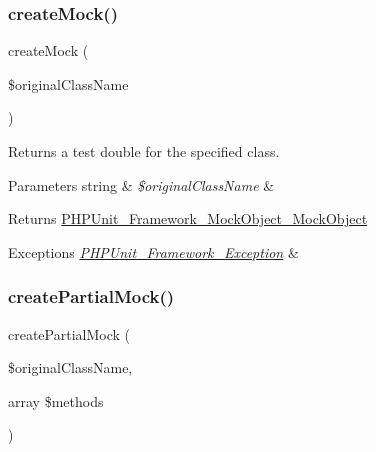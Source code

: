 \subsubsection{\texorpdfstring{create\+Mock()}{createMock()}}
{\footnotesize\ttfamily create\+Mock (\begin{DoxyParamCaption}\item[{}]{\$original\+Class\+Name }\end{DoxyParamCaption})\hspace{0.3cm}{\ttfamily [protected]}}

Returns a test double for the specified class.


\begin{DoxyParams}[1]{Parameters}
string & {\em \$original\+Class\+Name} & \\
\hline
\end{DoxyParams}
\begin{DoxyReturn}{Returns}
\mbox{\hyperlink{interface_p_h_p_unit___framework___mock_object___mock_object}{P\+H\+P\+Unit\+\_\+\+Framework\+\_\+\+Mock\+Object\+\_\+\+Mock\+Object}}
\end{DoxyReturn}

\begin{DoxyExceptions}{Exceptions}
{\em \mbox{\hyperlink{class_p_h_p_unit___framework___exception}{P\+H\+P\+Unit\+\_\+\+Framework\+\_\+\+Exception}}} & \\
\hline
\end{DoxyExceptions}
\mbox{\label{class_p_h_p_unit___framework___test_case_a6baede145d4c976da342aff0f2483972}} 
\subsubsection{\texorpdfstring{create\+Partial\+Mock()}{createPartialMock()}}
{\footnotesize\ttfamily create\+Partial\+Mock (\begin{DoxyParamCaption}\item[{}]{\$original\+Class\+Name,  }\item[{array}]{\$methods }\end{DoxyParamCaption})\hspace{0.3cm}{\ttfamily [protected]}}

